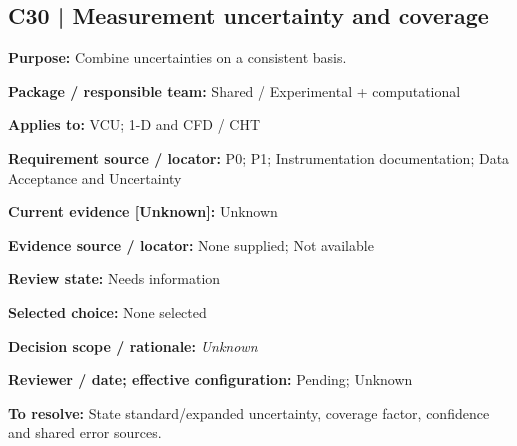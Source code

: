 \documentclass[11pt]{article}
\begin{document}
\par\noindent\begin{minipage}{\textwidth}\small\setlength{\parskip}{2pt}
\subsection*{C30 | Measurement uncertainty and coverage}
\textbf{Purpose:} Combine uncertainties on a consistent basis.\par
\textbf{Package / responsible team:} Shared / Experimental + computational\par
\textbf{Applies to:} VCU; 1-D and CFD / CHT\par
\textbf{Requirement source / locator:} P0; P1; Instrumentation documentation; Data Acceptance and Uncertainty\par
\textbf{Current evidence [Unknown]:} Unknown\par
\textbf{Evidence source / locator:} None supplied; Not available\par
\textbf{Review state:} Needs information\par
\textbf{Selected choice:} None selected\par
\textbf{Decision scope / rationale:} \textit{Unknown}\par
\textbf{Reviewer / date; effective configuration:} Pending; Unknown\par
\textbf{To resolve:} State standard/expanded uncertainty, coverage factor, confidence and shared error sources.\par
\end{minipage}\par\vspace{5pt}
\end{document}
